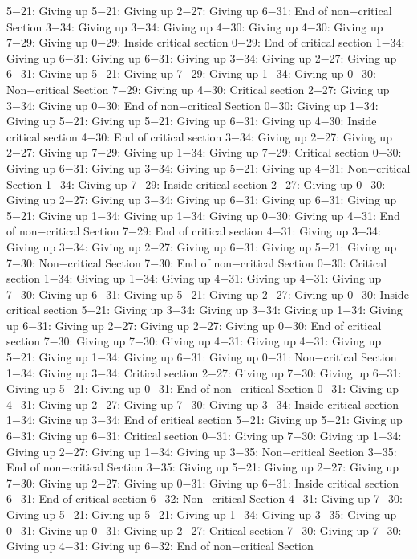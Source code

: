 5−21: Giving up
5−21: Giving up
2−27: Giving up
6−31: End of non−critical Section
3−34: Giving up
3−34: Giving up
4−30: Giving up
4−30: Giving up
7−29: Giving up
0−29: Inside critical section
0−29: End of critical section
1−34: Giving up
6−31: Giving up
6−31: Giving up
3−34: Giving up
2−27: Giving up
6−31: Giving up
5−21: Giving up
7−29: Giving up
1−34: Giving up
0−30: Non−critical Section
7−29: Giving up
4−30: Critical section
2−27: Giving up
3−34: Giving up
0−30: End of non−critical Section
0−30: Giving up
1−34: Giving up
5−21: Giving up
5−21: Giving up
6−31: Giving up
4−30: Inside critical section
4−30: End of critical section
3−34: Giving up
2−27: Giving up
2−27: Giving up
7−29: Giving up
1−34: Giving up
7−29: Critical section
0−30: Giving up
6−31: Giving up
3−34: Giving up
5−21: Giving up
4−31: Non−critical Section
1−34: Giving up
7−29: Inside critical section
2−27: Giving up
0−30: Giving up
2−27: Giving up
3−34: Giving up
6−31: Giving up
6−31: Giving up
5−21: Giving up
1−34: Giving up
1−34: Giving up
0−30: Giving up
4−31: End of non−critical Section
7−29: End of critical section
4−31: Giving up
3−34: Giving up
3−34: Giving up
2−27: Giving up
6−31: Giving up
5−21: Giving up
7−30: Non−critical Section
7−30: End of non−critical Section
0−30: Critical section
1−34: Giving up
1−34: Giving up
4−31: Giving up
4−31: Giving up
7−30: Giving up
6−31: Giving up
5−21: Giving up
2−27: Giving up
0−30: Inside critical section
5−21: Giving up
3−34: Giving up
3−34: Giving up
1−34: Giving up
6−31: Giving up
2−27: Giving up
2−27: Giving up
0−30: End of critical section
7−30: Giving up
7−30: Giving up
4−31: Giving up
4−31: Giving up
5−21: Giving up
1−34: Giving up
6−31: Giving up
0−31: Non−critical Section
1−34: Giving up
3−34: Critical section
2−27: Giving up
7−30: Giving up
6−31: Giving up
5−21: Giving up
0−31: End of non−critical Section
0−31: Giving up
4−31: Giving up
2−27: Giving up
7−30: Giving up
3−34: Inside critical section
1−34: Giving up
3−34: End of critical section
5−21: Giving up
5−21: Giving up
6−31: Giving up
6−31: Critical section
0−31: Giving up
7−30: Giving up
1−34: Giving up
2−27: Giving up
1−34: Giving up
3−35: Non−critical Section
3−35: End of non−critical Section
3−35: Giving up
5−21: Giving up
2−27: Giving up
7−30: Giving up
2−27: Giving up
0−31: Giving up
6−31: Inside critical section
6−31: End of critical section
6−32: Non−critical Section
4−31: Giving up
7−30: Giving up
5−21: Giving up
5−21: Giving up
1−34: Giving up
3−35: Giving up
0−31: Giving up
0−31: Giving up
2−27: Critical section
7−30: Giving up
7−30: Giving up
4−31: Giving up
6−32: End of non−critical Section
